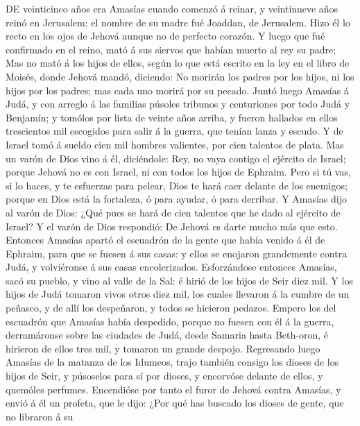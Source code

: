  DE veinticinco años era Amasías cuando comenzó á reinar,
y veintinueve años reinó en Jerusalem: el nombre de su madre fué
Joaddan, de Jerusalem.  Hizo él lo recto en los ojos de
Jehová aunque no de perfecto corazón.  Y luego que fué
confirmado en el reino, mató á sus siervos que habían muerto al rey su
padre;  Mas no mató á los hijos de ellos, según lo que
está escrito en la ley en el libro de Moisés, donde Jehová mandó,
diciendo: No morirán los padres por los hijos, ni los hijos por los
padres; mas cada uno morirá por su pecado.  Juntó luego
Amasías á Judá, y con arreglo á las familias púsoles tribunos y
centuriones por todo Judá y Benjamín; y tomólos por lista de veinte años
arriba, y fueron hallados en ellos trescientos mil escogidos para salir
á la guerra, que tenían lanza y escudo.  Y de Israel tomó
á sueldo cien mil hombres valientes, por cien talentos de plata.
 Mas un varón de Dios vino á él, diciéndole: Rey, no vaya
contigo el ejército de Israel; porque Jehová no es con Israel, ni con
todos los hijos de Ephraim.  Pero si tú vas, si lo haces,
y te esfuerzas para pelear, Dios te hará caer delante de los enemigos;
porque en Dios está la fortaleza, ó para ayudar, ó para derribar.
 Y Amasías dijo al varón de Dios: ¿Qué pues se hará de
cien talentos que he dado al ejército de Israel? Y el varón de Dios
respondió: De Jehová es darte mucho más que esto. 
Entonces Amasías apartó el escuadrón de la gente que había venido á él
de Ephraim, para que se fuesen á sus casas: y ellos se enojaron
grandemente contra Judá, y volviéronse á sus casas encolerizados.
 Esforzándose entonces Amasías, sacó su pueblo, y vino al
valle de la Sal: é hirió de los hijos de Seir diez mil. 
Y los hijos de Judá tomaron vivos otros diez mil, los cuales llevaron á
la cumbre de un peñasco, y de allí los despeñaron, y todos se hicieron
pedazos.  Empero los del escuadrón que Amasías había
despedido, porque no fuesen con él á la guerra, derramáronse sobre las
ciudades de Judá, desde Samaria hasta Beth-oron, é hirieron de ellos
tres mil, y tomaron un grande despojo.  Regresando luego
Amasías de la matanza de los Idumeos, trajo también consigo los dioses
de los hijos de Seir, y púsoselos para sí por dioses, y encorvóse
delante de ellos, y quemóles perfumes.  Encendióse por
tanto el furor de Jehová contra Amasías, y envió á él un profeta, que le
dijo: ¿Por qué has buscado los dioses de gente, que no libraron á su
